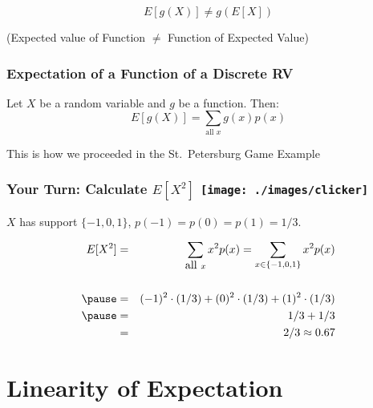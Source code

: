 \begin{frame}
\huge $$E[g(X)] \neq g(E[X])$$
\begin{center}
	\large (Expected value of Function $\neq$ Function of Expected Value)
\end{center}


\end{frame}

\begin{frame}
\frametitle{Expectation of a Function of a Discrete RV}
Let $X$ be a random variable and $g$ be a function. Then:
$$\boxed{E[g(X)] = \sum_{\mbox{all } x} g(x) p(x)}$$


 \alert{This is how we proceeded in the St.\ Petersburg Game Example}
\end{frame}
\begin{frame}
\frametitle{Your Turn: Calculate $E[X^2]$ \hfill \texttt{[image: ./images/clicker]}}
$X$ has support $\{-1, 0, 1\}$, $p(-1) = p(0) = p(1) = 1/3$.
\pause

\begin{eqnarray*}
 E[X^2] &=&  \sum_{\mbox{all } x} x^2 p(x) = \sum_{x \in \{-1, 0, 1\}} x^2 p(x) \\ \\ \pause
 	&=& (-1)^2 \cdot (1/3) + (0)^2 \cdot (1/3) + (1)^2 \cdot (1/3)\\ \pause
 	&=& 1/3 + 1/3\\ 
 	&=& 2/3 \approx 0.67
\end{eqnarray*}

\end{frame}

\section{Linearity of Expectation}

